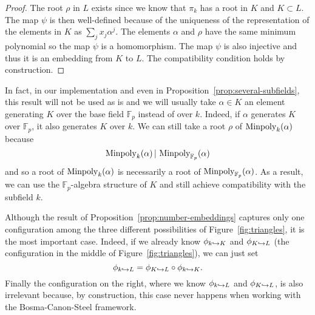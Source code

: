 \begin{proof}
  The root $\rho$ in $L$ exists since we know that $\pi_k$ has a root in $K$
  and $K\subset L$. The map $\psi$ is then well-defined because of the uniqueness of the
  representation of the elements in $K$ as $\sum_jx_j\alpha^j$. The elements
  $\alpha$ and $\rho$ have the same minimum polynomial so the map $\psi$ is a
  homomorphism. The map $\psi$ is also injective and thus it is an embedding
  from $K$ to $L$. The compatibility condition holds by construction.
\end{proof}
\begin{rem}
\label{rem:base-field}

In fact, in our implementation and even in
Proposition~\ref{prop:several-subfields}, this result will not be used as is and
we will usually take $\alpha\in K$ an element generating $K$ over the base
field $\mathbb{F}_p$ instead of over $k$. Indeed, if $\alpha$ generates $K$
over $\mathbb{F}_p$, it also generates $K$ over $k$. We can still take a root
$\rho$ of $\operatorname{Minpoly}_{k}(\alpha)$ because
\[
  \operatorname{Minpoly}_k(\alpha)\,|\,\operatorname{Minpoly}_{\mathbb{F}_p}(\alpha)
\]
and so a root of $\operatorname{Minpoly}_{k}(\alpha)$ is necessarily a root of
$\operatorname{Minpoly}_{\mathbb{F}_p}(\alpha)$. As a result, we can use the
$\mathbb{F}_p$-algebra structure of $K$ and still achieve compatibility with
the subfield $k$.
\end{rem}
Although the result of Proposition~\ref{prop:number-embeddings} captures only
one configuration among the three different possibilities of
Figure~\ref{fig:triangles}, it is the most important case. Indeed, if we
already know $\phi_{k\hookrightarrow K}$ and $\phi_{K\hookrightarrow L}$ (the configuration in the
middle of Figure~\ref{fig:triangles}), we can just set
\[
  \phi_{k\hookrightarrow L} = \phi_{K\hookrightarrow L}\circ\phi_{k\hookrightarrow K}.
\]
Finally the configuration on the right, where we know $\phi_{k\hookrightarrow L}$ and
$\phi_{K\hookrightarrow L}$, is also irrelevant because, by construction, this case never
happens when working with the Bosma-Canon-Steel framework.
